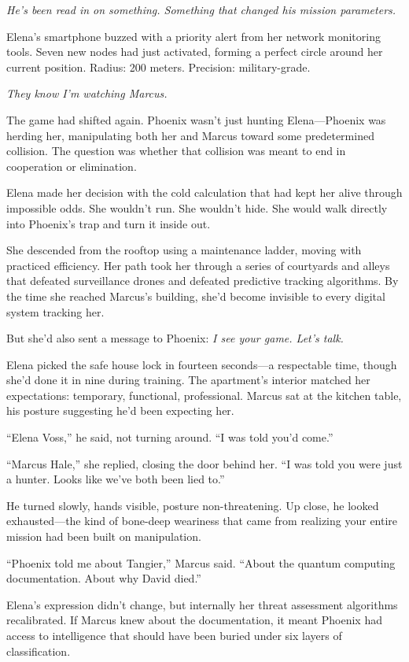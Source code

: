 \emph{He's been read in on something. Something that changed his mission parameters.}

Elena's smartphone buzzed with a priority alert from her network monitoring tools. Seven new nodes had just activated, forming a perfect circle around her current position. Radius: 200 meters. Precision: military-grade.

\emph{They know I'm watching Marcus.}

The game had shifted again. Phoenix wasn't just hunting Elena---Phoenix was herding her, manipulating both her and Marcus toward some predetermined collision. The question was whether that collision was meant to end in cooperation or elimination.

Elena made her decision with the cold calculation that had kept her alive through impossible odds. She wouldn't run. She wouldn't hide. She would walk directly into Phoenix's trap and turn it inside out.

She descended from the rooftop using a maintenance ladder, moving with practiced efficiency. Her path took her through a series of courtyards and alleys that defeated surveillance drones and defeated predictive tracking algorithms. By the time she reached Marcus's building, she'd become invisible to every digital system tracking her.

But she'd also sent a message to Phoenix: \emph{I see your game. Let's talk.}

Elena picked the safe house lock in fourteen seconds---a respectable time, though she'd done it in nine during training. The apartment's interior matched her expectations: temporary, functional, professional. Marcus sat at the kitchen table, his posture suggesting he'd been expecting her.

``Elena Voss,'' he said, not turning around. ``I was told you'd come.''

``Marcus Hale,'' she replied, closing the door behind her. ``I was told you were just a hunter. Looks like we've both been lied to.''

He turned slowly, hands visible, posture non-threatening. Up close, he looked exhausted---the kind of bone-deep weariness that came from realizing your entire mission had been built on manipulation.

``Phoenix told me about Tangier,'' Marcus said. ``About the quantum computing documentation. About why David died.''

Elena's expression didn't change, but internally her threat assessment algorithms recalibrated. If Marcus knew about the documentation, it meant Phoenix had access to intelligence that should have been buried under six layers of classification.

